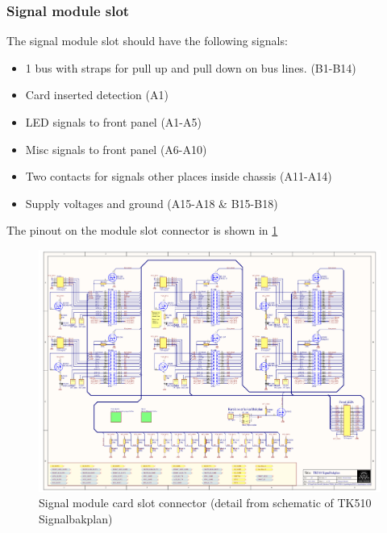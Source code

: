\subsubsection{Signal module slot}
The signal module slot should have the following signals:
\begin{itemize}
    \item 1 bus with straps for pull up and pull down on bus lines. (B1-B14)
    \item Card inserted detection (A1)
    \item LED signals to front panel (A1-A5)
    \item Misc signals to front panel (A6-A10)
    \item Two contacts for signals other places inside chassis (A11-A14)
    \item Supply voltages and ground (A15-A18 \& B15-B18)
\end{itemize}
The pinout on the module slot connector is shown in \cref{fig:signalmodulslot}

\begin{figure}[h]
    \centering
    \includegraphics[trim={4.1cm 14.3cm 21.2cm 3.3cm},clip,width=\textwidth]{img/TK510_Signalbakplan.pdf}
    \caption{Signal module card slot connector (detail from schematic of TK510 Signalbakplan)}
    \label{fig:signalmodulslot}
\end{figure}
